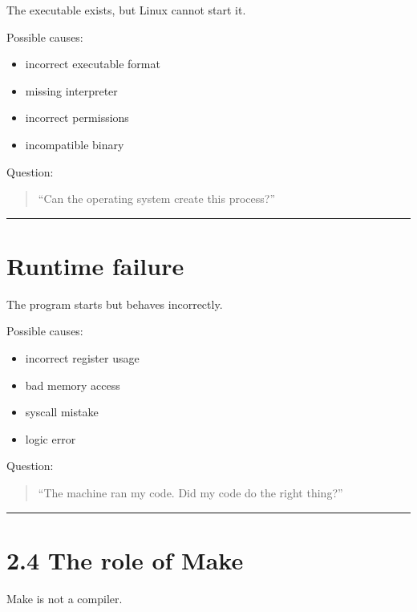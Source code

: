 \documentclass[
  oneside,
  openany]{book}
\providecommand{\tightlist}{%
  \setlength{\itemsep}{0pt}\setlength{\parskip}{0pt}}
\begin{document}
The executable exists, but Linux cannot start it.

Possible causes:

\begin{itemize}
\tightlist
\item
  incorrect executable format
\item
  missing interpreter
\item
  incorrect permissions
\item
  incompatible binary
\end{itemize}

Question:

\begin{quote}
``Can the operating system create this process?''
\end{quote}

\begin{center}\rule{0.5\linewidth}{0.5pt}\end{center}

\hypertarget{runtime-failure}{%
\section{Runtime failure}\label{runtime-failure}}

The program starts but behaves incorrectly.

Possible causes:

\begin{itemize}
\tightlist
\item
  incorrect register usage
\item
  bad memory access
\item
  syscall mistake
\item
  logic error
\end{itemize}

Question:

\begin{quote}
``The machine ran my code. Did my code do the right thing?''
\end{quote}

\begin{center}\rule{0.5\linewidth}{0.5pt}\end{center}

\hypertarget{the-role-of-make}{%
\section{2.4 The role of Make}\label{the-role-of-make}}

Make is not a compiler.
\end{document}
